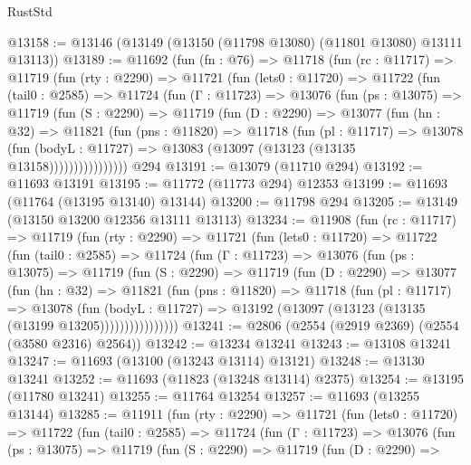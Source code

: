 \begin{lexlean}{RustStd}
\begin{coremodule}
@13158 := @13146 (@13149 (@13150 (@11798 @13080) (@11801 @13080) @13111 @13113))
@13189 := @11692
    (fun (fn : @76) =>
    @11718
      (fun (rc : @11717) =>
      @11719
        (fun (rty : @2290) =>
        @11721
          (fun (lets0 : @11720) =>
          @11722
            (fun (tail0 : @2585) =>
            @11724
              (fun (Γ : @11723) =>
              @13076
                (fun (ps : @13075) =>
                @11719
                  (fun (S : @2290) =>
                  @11719
                    (fun (D : @2290) =>
                    @13077
                      (fun (hn : @32) =>
                      @11821
                        (fun (pns : @11820) =>
                        @11718
                          (fun (pl : @11717) =>
                          @13078
                            (fun (bodyL : @11727) =>
                            @13083 (@13097 (@13123 (@13135 @13158))))))))))))))))
    @294
@13191 := @13079 (@11710 @294)
@13192 := @11693 @13191
@13195 := @11772 (@11773 @294) @12353
@13199 := @11693 (@11764 (@13195 @13140) @13144)
@13200 := @11798 @294
@13205 := @13149 (@13150 @13200 @12356 @13111 @13113)
@13234 := @11908
    (fun (rc : @11717) =>
    @11719
      (fun (rty : @2290) =>
      @11721
        (fun (lets0 : @11720) =>
        @11722
          (fun (tail0 : @2585) =>
          @11724
            (fun (Γ : @11723) =>
            @13076
              (fun (ps : @13075) =>
              @11719
                (fun (S : @2290) =>
                @11719
                  (fun (D : @2290) =>
                  @13077
                    (fun (hn : @32) =>
                    @11821
                      (fun (pns : @11820) =>
                      @11718
                        (fun (pl : @11717) =>
                        @13078
                          (fun (bodyL : @11727) =>
                          @13192 (@13097 (@13123 (@13135 (@13199 @13205))))))))))))))))
@13241 := @2806 (@2554 (@2919 @2369) (@2554 (@3580 @2316) @2564))
@13242 := @13234 @13241
@13243 := @13108 @13241
@13247 := @11693 (@13100 (@13243 @13114) @13121)
@13248 := @13130 @13241
@13252 := @11693 (@11823 (@13248 @13114) @2375)
@13254 := @13195 (@11780 @13241)
@13255 := @11764 @13254
@13257 := @11693 (@13255 @13144)
@13285 := @11911
    (fun (rty : @2290) =>
    @11721
      (fun (lets0 : @11720) =>
      @11722
        (fun (tail0 : @2585) =>
        @11724
          (fun (Γ : @11723) =>
          @13076
            (fun (ps : @13075) =>
            @11719
              (fun (S : @2290) =>
              @11719
                (fun (D : @2290) =>

\end{coremodule}
\end{lexlean}
